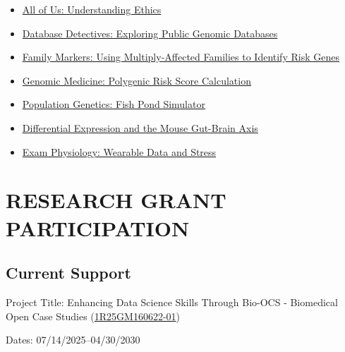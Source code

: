 \documentclass{cv}
\begin{document}
\begin{itemize}

\item \href{https://genomicseducation.org/module/AOU_ethics.html}{All of Us: Understanding Ethics}

\item \href{https://genomicseducation.org/module/database_detectives.html}{Database Detectives: Exploring Public Genomic Databases}

\item \href{https://genomicseducation.org/module/family_markers.html}{Family Markers: Using Multiply-Affected Families to Identify Risk Genes}

\item \href{https://genomicseducation.org/module/genomic_med_prs.html}{Genomic Medicine: Polygenic Risk Score Calculation}

\item \href{https://genomicseducation.org/module/pop_gen_hwe.html}{Population Genetics: Fish Pond Simulator}

\item \href{https://genomicseducation.org/module/mouse_gutbrain_de.html}{Differential Expression and the Mouse Gut-Brain Axis}

\item \href{https://genomicseducation.org/module/exam_phys.html}{Exam Physiology: Wearable Data and Stress}

\end{itemize}


\section*{RESEARCH GRANT PARTICIPATION}

\subsection*{Current Support}

Project Title: Enhancing Data Science Skills Through Bio-OCS - Biomedical Open Case Studies (\href{https://reporter.nih.gov/project-details/11216870}{1R25GM160622-01})

Dates: 07/14/2025--04/30/2030
\end{document}
